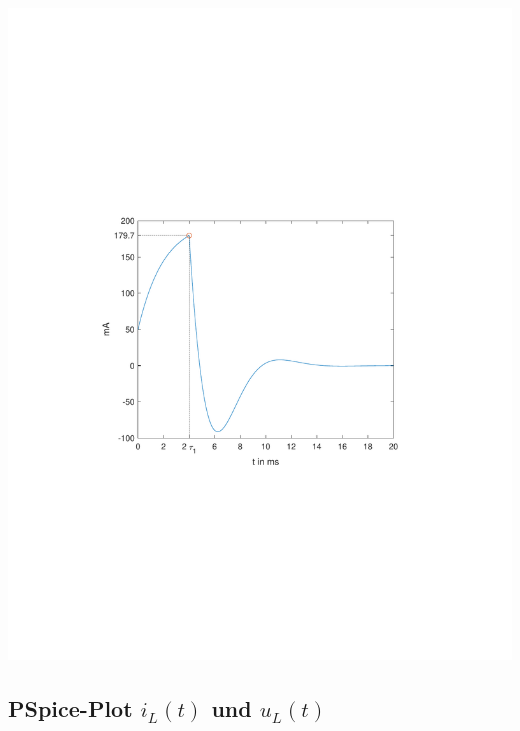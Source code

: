 \documentclass[11pt]{scrartcl}
\begin{document}
\begin{center}

	\includegraphics[width=0.8\linewidth]{./Assets/ML_Strom_Plot.pdf}
	\label{fig:ML_Strom_Plot}
\end{center}

\subsection{PSpice-Plot $i_L(t)$ und $u_L(t)$} %
\end{document}
